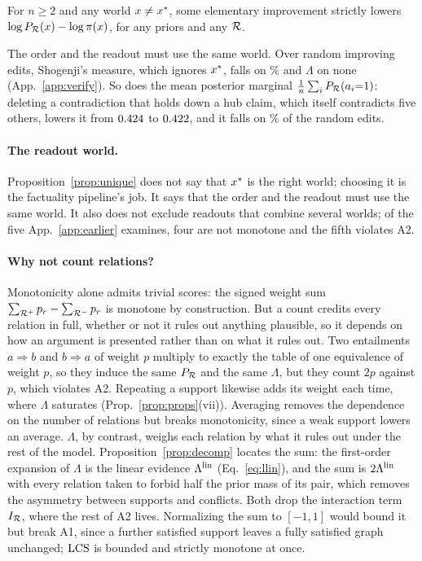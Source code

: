 \begin{proposition}
\label{prop:unique}
For $n\ge2$ and any world $x\neq x^{\ast}$, some elementary improvement strictly lowers
$\log P_{\mathcal{R}}(x)-\log\pi(x)$, for any priors and any $\mathcal{R}$.
\end{proposition}

The order and the readout must use the same world. Over \thmSteps{} random improving edits,
Shogenji's measure, which ignores $x^{\ast}$, falls on \fallsPctShogenjiSigndef\% and $\Lambda$ on none
(App.~\ref{app:verify}). So does the mean posterior marginal $\frac1n\sum_iP_{\mathcal{R}}(a_i{=}1)$: deleting a
contradiction that holds down a hub claim, which itself contradicts five others, lowers it from
$0.424$ to $0.422$, and it falls on \fallsPctMmSigndef\% of the random edits.

\paragraph{The readout world.} Proposition~\ref{prop:unique} does not say that $x^{\ast}$ is the right
world; choosing it is the factuality pipeline's job. It says that the order and the readout must
use the same world. It also does not exclude readouts that combine several worlds; of the five
App.~\ref{app:earlier} examines, four are not monotone and the fifth violates A2.

\paragraph{Why not count relations?} Monotonicity alone admits trivial scores: the signed weight sum
$\sum_{\mathcal{R}^{+}}p_r-\sum_{\mathcal{R}^{-}}p_r$ is monotone by construction. But a count credits every relation in
full, whether or not it rules out anything plausible, so it depends on how an argument is presented
rather than on what it rules out. Two entailments $a\Rightarrow b$ and $b\Rightarrow a$ of weight
$p$ multiply to exactly the table of one equivalence of weight $p$, so they induce the same $P_{\mathcal{R}}$
and the same $\Lambda$, but they count $2p$ against $p$, which violates A2. Repeating a support
likewise adds its weight each time, where $\Lambda$ saturates (Prop.~\ref{prop:props}(vii)).
Averaging removes the dependence on the number of relations but breaks monotonicity, since a weak
support lowers an average. $\Lambda$, by contrast, weighs each relation by what it rules out under
the rest of the model. Proposition~\ref{prop:decomp} locates the sum: the first-order expansion of $\Lambda$ is the
linear evidence $\Lambda^{\mathrm{lin}}$ (Eq.~\ref{eq:llin}), and the sum is $2\Lambda^{\mathrm{lin}}$ with every relation taken to
forbid half the prior mass of its pair, which removes the asymmetry between supports and conflicts.
Both drop the interaction term $I_{\mathcal{R}}$, where the rest of A2 lives. Normalizing the sum to $[-1,1]$ would bound it but break A1, since a further satisfied
support leaves a fully satisfied graph unchanged; $\mathrm{LCS}$ is bounded and strictly monotone at once.


